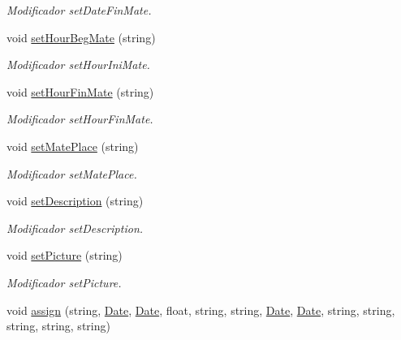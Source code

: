 \begin{DoxyCompactItemize}
\begin{DoxyCompactList}\small\item\em Modificador set\+Date\+Fin\+Mate. \end{DoxyCompactList}\item 
void \hyperlink{class_event_aae0a98a97eaa0f64ace61a069911a473}{set\+Hour\+Beg\+Mate} (string)\hypertarget{class_event_aae0a98a97eaa0f64ace61a069911a473}{}\label{class_event_aae0a98a97eaa0f64ace61a069911a473}

\begin{DoxyCompactList}\small\item\em Modificador set\+Hour\+Ini\+Mate. \end{DoxyCompactList}\item 
void \hyperlink{class_event_ad7e81513dcb7b9fddb7f670171b0402c}{set\+Hour\+Fin\+Mate} (string)\hypertarget{class_event_ad7e81513dcb7b9fddb7f670171b0402c}{}\label{class_event_ad7e81513dcb7b9fddb7f670171b0402c}

\begin{DoxyCompactList}\small\item\em Modificador set\+Hour\+Fin\+Mate. \end{DoxyCompactList}\item 
void \hyperlink{class_event_ac2df54c72bf6a913ef8cea23f9164561}{set\+Mate\+Place} (string)\hypertarget{class_event_ac2df54c72bf6a913ef8cea23f9164561}{}\label{class_event_ac2df54c72bf6a913ef8cea23f9164561}

\begin{DoxyCompactList}\small\item\em Modificador set\+Mate\+Place. \end{DoxyCompactList}\item 
void \hyperlink{class_event_a10101412d581dc0a23e6bde775e8330b}{set\+Description} (string)\hypertarget{class_event_a10101412d581dc0a23e6bde775e8330b}{}\label{class_event_a10101412d581dc0a23e6bde775e8330b}

\begin{DoxyCompactList}\small\item\em Modificador set\+Description. \end{DoxyCompactList}\item 
void \hyperlink{class_event_a6ebd602ac071857bc3603713f372af16}{set\+Picture} (string)\hypertarget{class_event_a6ebd602ac071857bc3603713f372af16}{}\label{class_event_a6ebd602ac071857bc3603713f372af16}

\begin{DoxyCompactList}\small\item\em Modificador set\+Picture. \end{DoxyCompactList}\item 
void \hyperlink{class_event_a114abce3ab2a010cdd29eb6765ddc148}{assign} (string, \hyperlink{class_date}{Date}, \hyperlink{class_date}{Date}, float, string, string, \hyperlink{class_date}{Date}, \hyperlink{class_date}{Date}, string, string, string, string, string)\hypertarget{class_event_a114abce3ab2a010cdd29eb6765ddc148}{}\label{class_event_a114abce3ab2a010cdd29eb6765ddc148}


\end{DoxyCompactItemize}
